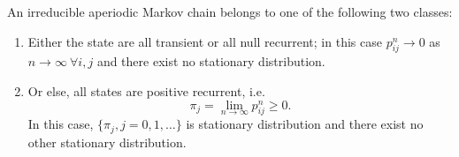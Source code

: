 \begin{theorem}
    An irreducible aperiodic Markov chain belongs to one of the following two classes:
    \begin{enumerate}
        \item Either the state are all transient or all null recurrent; in this case $ p^{n}_{ij}\to 0 $ as $ n\to \infty \ \forall i,j $
            and there exist no stationary distribution.
        \item Or else, all states are positive recurrent, i.e.
            \begin{equation}
                \label{stationart probability}
                \pi_{j} = \lim_{n\to \infty}p_{ij}^{n}\ge 0.
            \end{equation}
            In this case, $ \{\pi_{j},j=0,1,\ldots\} $ is stationary distribution and there exist no other stationary distribution.
    \end{enumerate}
\end{theorem}
